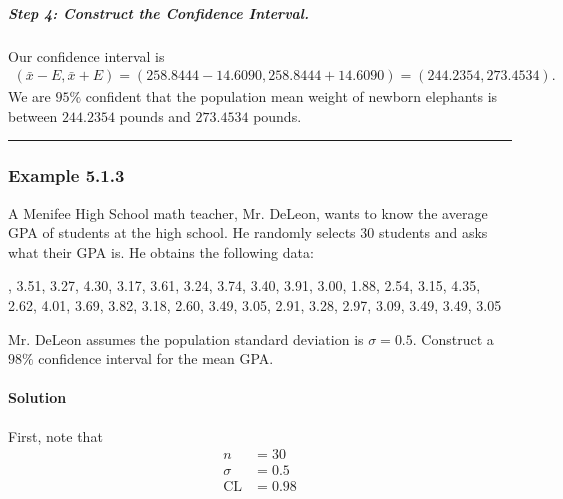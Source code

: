 \documentclass[letterpaper,10pt,english]{jupyterBook}
\begin{document}
\subparagraph{Step 4: Construct the Confidence Interval.}
\label{\detokenize{Ch5 Confidence Intervals/5.1 Estimating Population Means (Sigma Known):step-4-construct-the-confidence-interval}}
\sphinxAtStartPar
Our confidence interval is
\begin{equation*}
\begin{split}(\bar{x} - E, \bar{x} + E) = (258.8444 - 14.6090, 258.8444 + 14.6090) = (244.2354, 273.4534). \end{split}
\end{equation*}
\sphinxAtStartPar
We are \(95\%\) confident that the population mean weight of newborn elephants is between \(244.2354\) pounds and \(273.4534\) pounds.


\bigskip\hrule\bigskip



\subsubsection{Example 5.1.3}
\label{\detokenize{Ch5 Confidence Intervals/5.1 Estimating Population Means (Sigma Known):example-5-1-3}}
\sphinxAtStartPar
A Menifee High School math teacher, Mr. DeLeon, wants to know the average GPA of students at the high school. He randomly selects \(30\) students and asks what their GPA is. He obtains the following data:

, 3.51, 3.27, 4.30, 3.17, 3.61, 3.24, 3.74, 3.40, 3.91, 3.00, 1.88, 2.54, 3.15, 4.35, 2.62, 4.01, 3.69, 3.82, 3.18, 2.60, 3.49, 3.05, 2.91, 3.28, 2.97, 3.09, 3.49, 3.49, 3.05

\sphinxAtStartPar
Mr. DeLeon assumes the population standard deviation is \(\sigma = 0.5\). Construct a \(98\%\) confidence interval for the mean GPA.


\paragraph{Solution}
\label{\detokenize{Ch5 Confidence Intervals/5.1 Estimating Population Means (Sigma Known):id2}}
\sphinxAtStartPar
First, note that
\begin{align*}
n &= 30 \\
\sigma &= 0.5 \\
\text{CL} &= 0.98
\end{align*}
\end{document}
